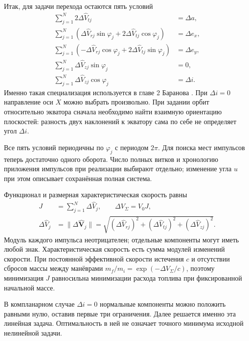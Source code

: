 Итак, для задачи перехода остаются пять условий
\begin{equation}
 \boxed{\begin{aligned}
  \sum_{j=1}^N2\Delta\widehat V_{tj}&=\Delta a,\\
  \sum_{j=1}^N(\Delta\widehat V_{rj}\sin\varphi_j
       +2\Delta\widehat V_{tj}\cos\varphi_j)&=\Delta e_x,\\
  \sum_{j=1}^N(-\Delta\widehat V_{rj}\cos\varphi_j
       +2\Delta\widehat V_{tj}\sin\varphi_j)&=\Delta e_y,\\
  \sum_{j=1}^N\Delta\widehat V_{zj}\sin\varphi_j&=0,\\
  \sum_{j=1}^N\Delta\widehat V_{zj}\cos\varphi_j&=\Delta i.
 \end{aligned}}
 \label{eq:five-boundary-equations}
\end{equation}
Именно такая специализация используется в главе 2 Баранова
\cite{baranov-ru}. При $\Delta i=0$ направление оси $X$
можно выбрать произвольно. При задании орбит относительно
экватора сначала необходимо найти взаимную ориентацию плоскостей:
разность двух наклонений к экватору сама по себе не определяет
угол $\Delta i$.

Все пять условий периодичны по $\varphi_j$ с периодом $2\pi$.
Для поиска мест импульсов теперь достаточно одного оборота.
Число полных витков и хронологию приложения импульсов при
реализации выбирают отдельно; изменение угла $u$ при этом описывает
сохранённая полная система.

Функционал и размерная характеристическая скорость равны
\begin{equation}
 \begin{aligned}
 J&=\sum_{j=1}^N\Delta\widehat V_j,\qquad
 \Delta V_\Sigma=V_0J,\\
 \Delta\widehat V_j
  &=\lVert\Delta\widehat{\boldsymbol V}_j\rVert
   =\sqrt{(\Delta\widehat V_{rj})^2
          +(\Delta\widehat V_{tj})^2
          +(\Delta\widehat V_{zj})^2}.
 \end{aligned}
 \label{eq:linear-transfer-cost}
\end{equation}
Модуль каждого импульса неотрицателен; отдельные компоненты могут
иметь любой знак. Характеристическая скорость есть сумма модулей
изменений скорости. При постоянной эффективной скорости истечения
$c$ и отсутствии сбросов массы между манёврами
$m_f/m_i=\exp(-\Delta V_\Sigma/c)$, поэтому минимизация $J$
равносильна минимизации расхода топлива при фиксированной
начальной массе.

В компланарном случае $\Delta i=0$ нормальные компоненты можно
положить равными нулю, оставив первые три ограничения.
Далее решается именно эта линейная задача. Оптимальность в ней
не означает точного минимума исходной нелинейной задачи.


